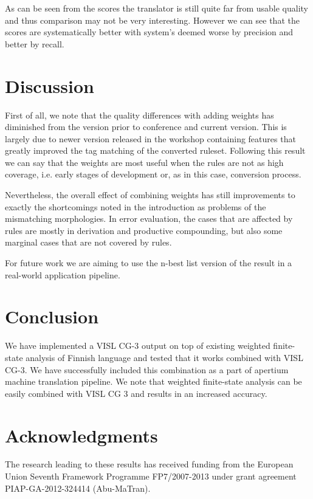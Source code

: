 \documentclass[11pt]{article}
\begin{document}
As can be seen from the scores the translator is still quite far from usable
quality and thus comparison may not be very interesting. However we can see
that the scores are systematically better with system's deemed worse by
precision and better by recall.


\section{Discussion}
\label{sec:discussion}

First of all, we note that the quality differences with adding weights has
diminished from the version prior to conference and current version. This is
largely due to newer version released in the workshop containing features that
greatly improved the tag matching of the converted ruleset. Following this
result we can say that the weights are most useful when the rules are not
as high coverage, i.e. early stages of development or, as in this case,
conversion process.

Nevertheless, the overall effect of combining weights has still improvements
to exactly the shortcomings noted in the introduction as problems of the
mismatching morphologies. In error evaluation, the cases that are affected
by rules are mostly in derivation and productive compounding, but also some
marginal cases that are not covered by rules.

For future work we are aiming to use the n-best list version of the result in
a real-world application pipeline.

\section{Conclusion}
\label{sec:conclusion}

We have implemented a VISL CG-3 output on top of existing weighted finite-state
analysis of Finnish language and tested that it works combined with VISL CG-3.
We have successfully included this combination as a part of apertium machine
translation pipeline. We note that weighted finite-state analysis can be
easily combined with VISL CG 3 and results in an increased accuracy.

\section*{Acknowledgments}

The research leading to these results has received
funding from the European Union Seventh Framework
Programme FP7/2007-2013 under grant agreement
PIAP-GA-2012-324414 (Abu-MaTran).




\end{document}
